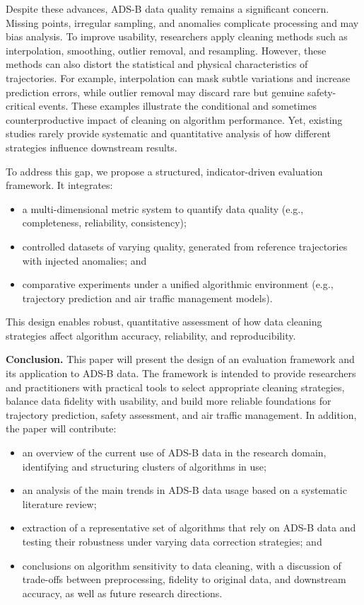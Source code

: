 Despite these advances, ADS-B data quality remains a significant concern. Missing points, irregular sampling, and anomalies complicate processing and may bias analysis. To improve usability, researchers apply cleaning methods such as interpolation, smoothing, outlier removal, and resampling. However, these methods can also distort the statistical and physical characteristics of trajectories. For example, interpolation can mask subtle variations and increase prediction errors, while outlier removal may discard rare but genuine safety-critical events. These examples illustrate the conditional and sometimes counterproductive impact of cleaning on algorithm performance. Yet, existing studies rarely provide systematic and quantitative analysis of how different strategies influence downstream results.

To address this gap, we propose a structured, indicator-driven evaluation framework. It integrates:

\begin{itemize}
  \item a multi-dimensional metric system to quantify data quality (e.g., completeness, reliability, consistency);
  \item controlled datasets of varying quality, generated from reference trajectories with injected anomalies; and
  \item comparative experiments under a unified algorithmic environment (e.g., trajectory prediction and air traffic management models).
\end{itemize}

This design enables robust, quantitative assessment of how data cleaning strategies affect algorithm accuracy, reliability, and reproducibility.




\textbf{Conclusion.} This paper will present the design of an evaluation framework and its application to ADS-B data. 
The framework is intended to provide researchers and practitioners with practical tools to select appropriate cleaning strategies, 
balance data fidelity with usability, and build more reliable foundations for trajectory prediction, safety assessment, and air traffic management. 
In addition, the paper will contribute:
\begin{itemize}
  \item an overview of the current use of ADS-B data in the research domain, identifying and structuring clusters of algorithms in use;
  \item an analysis of the main trends in ADS-B data usage based on a systematic literature review;
  \item extraction of a representative set of algorithms that rely on ADS-B data and testing their robustness under varying data correction strategies; and
  \item conclusions on algorithm sensitivity to data cleaning, with a discussion of trade-offs between preprocessing, fidelity to original data, and downstream accuracy, as well as future research directions.
\end{itemize}
